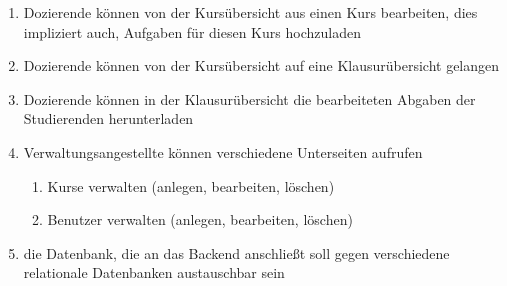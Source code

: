 \begin{enumerate}
	\item \gls{Dozierende} können von der Kursübersicht aus einen \gls{Kurs} bearbeiten, dies impliziert auch, \gls{Aufgabe}n für diesen \gls{Kurs} hochzuladen
	\item \gls{Dozierende} können von der Kursübersicht auf eine Klausurübersicht gelangen
	\item \gls{Dozierende} können in der Klausurübersicht die bearbeiteten Abgaben der \gls{Studierende}n herunterladen
	\item \gls{Verwaltungsangestellte} können verschiedene Unterseiten aufrufen
	\begin{enumerate}
		\item \gls{Kurs}e verwalten (anlegen, bearbeiten, löschen)
		\item Benutzer verwalten (anlegen, bearbeiten, löschen)
	\end{enumerate}	 
	\item die Datenbank, die an das Backend anschließt soll gegen verschiedene \gls{relationale Datenbank}en austauschbar sein
\end{enumerate}